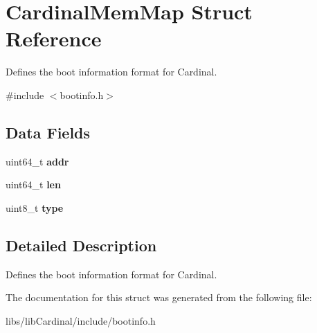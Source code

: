 \hypertarget{structCardinalMemMap}{}\section{Cardinal\+Mem\+Map Struct Reference}
\label{structCardinalMemMap}


Defines the boot information format for Cardinal.  




{\ttfamily \#include $<$bootinfo.\+h$>$}

\subsection*{Data Fields}
\begin{DoxyCompactItemize}
\item 
uint64\+\_\+t {\bfseries addr}\hypertarget{structCardinalMemMap_a58126670297efc695d39375059fcd039}{}\label{structCardinalMemMap_a58126670297efc695d39375059fcd039}

\item 
uint64\+\_\+t {\bfseries len}\hypertarget{structCardinalMemMap_af0aad51893c8ab2668d7b06057bc9c81}{}\label{structCardinalMemMap_af0aad51893c8ab2668d7b06057bc9c81}

\item 
uint8\+\_\+t {\bfseries type}\hypertarget{structCardinalMemMap_af581ea9bf149777c9f26b5f9574fce3c}{}\label{structCardinalMemMap_af581ea9bf149777c9f26b5f9574fce3c}

\end{DoxyCompactItemize}


\subsection{Detailed Description}
Defines the boot information format for Cardinal. 

The documentation for this struct was generated from the following file\+:\begin{DoxyCompactItemize}
\item 
libs/lib\+Cardinal/include/bootinfo.\+h\end{DoxyCompactItemize}
